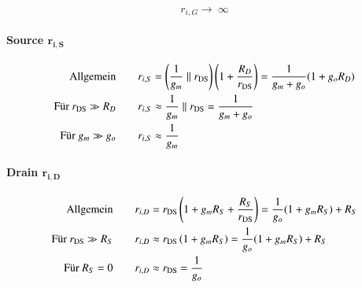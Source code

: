 \[
    r_{i, G} \to\ \infty
\]


\paragraph{Source $\bm{r_{i,S}}$}

\vspace{-0.3cm}

\begin{align*}
    \text{Allgemein}            & \qquad r_{i, S} = \left( \frac{1}{g_m} \parallel r_{\rm DS} \right) \left( 1 + \frac{R_D}{r_{\rm DS}} \right) = \frac{1}{g_m + g_o} (1 + g_o R_D) \\
    \text{Für } r_{\rm DS} \gg R_D  & \qquad r_{i, S} \approx \frac{1}{g_m} \parallel r_{\rm DS} = \frac{1}{g_m + g_o} \\
    \text{Für } g_m \gg g_o     & \qquad r_{i, S} \approx \frac{1}{g_m}
\end{align*}


\paragraph{Drain $\bm{r_{i,D}}$}

\vspace{-0.3cm}

\begin{align*}
    \text{Allgemein}            & \qquad r_{i, D} = r_{\rm DS} \left( 1 + g_m R_S + \frac{R_S}{r_{\rm DS}} \right) = \frac{1}{g_o} (1+g_m R_S) + R_S \\
    \text{Für } r_{\rm DS} \gg R_S  & \qquad r_{i, D} \approx r_{\rm DS} \left( 1 + g_m R_S \right) = \frac{1}{g_o} (1+g_m R_S) + R_S \\
    \text{Für } R_S = 0         & \qquad r_{i, D} \approx r_{\rm DS} = \frac{1}{g_o}
\end{align*}

